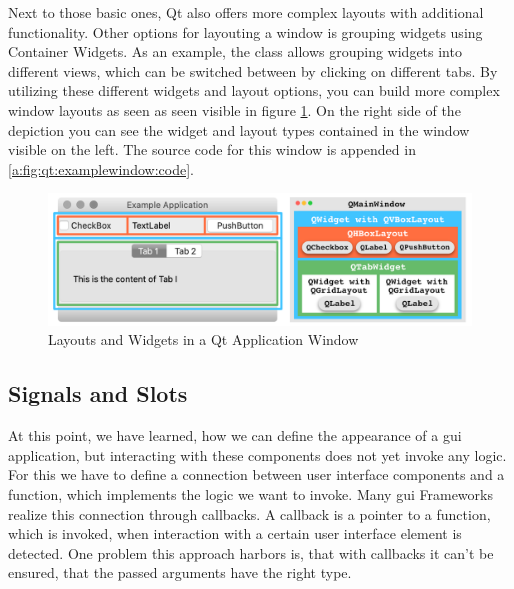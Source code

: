 Next to those basic ones, Qt also offers more complex layouts with additional
functionality. Other options for layouting a window is grouping widgets using
Container Widgets. As an example, the class
 allows grouping widgets into different
views, which can be switched between by clicking on different tabs. By utilizing
these different widgets and layout options, you can build more complex window
layouts as seen as seen visible in figure \ref{fig:qt:examplewindow}. On the
right side of the depiction you can see the widget and layout types contained in
the window visible on the left. The source code for this window is
appended in \ref{a:fig:qt:examplewindow:code}. 
\cite{PythonGui1}

\begin{figure}[h]
    \centering
    \includegraphics[width=15cm]{resources/img/QtExample}
    \caption{Layouts and Widgets in a Qt Application Window}
    \label{fig:qt:examplewindow}
\end{figure}



\subsection{Signals and Slots}
\label{sec:fundamentals:qt:signalsslots}

At this point, we have learned, how we can define the appearance of a \gls{gui}
application, but interacting with these components does not yet invoke any
logic. For this we have to define a connection between user interface
components and a function, which implements the logic we want to invoke. Many
\gls{gui} Frameworks realize this connection through callbacks. A callback is a
pointer to a function, which is invoked, when interaction with a certain user
interface element is detected. One problem this approach harbors is, that with
callbacks it can't be ensured, that the passed arguments have the right type.

